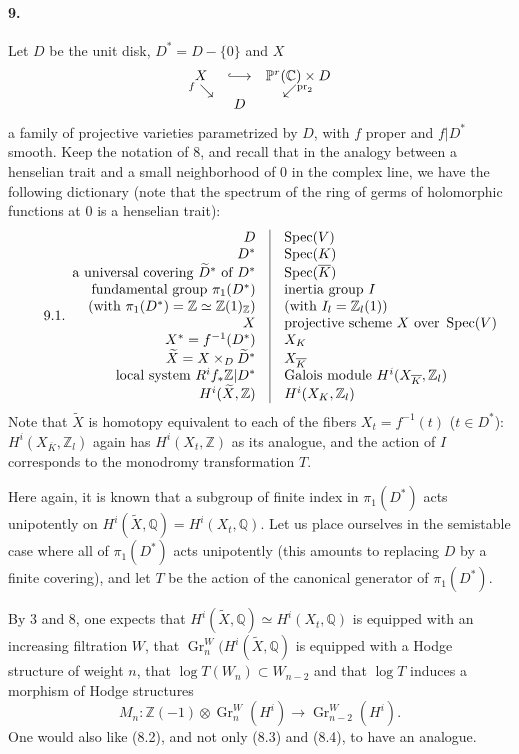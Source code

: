 \documentclass[10pt]{article}
\newcommand{\C}{\mathbb C}
\newcommand{\Q}{\mathbb Q}
\newcommand{\Z}{\mathbb Z}
\newcommand{\Gr}{\operatorname{Gr}}
\newcommand{\Spec}{\operatorname{Spec}}
\newcommand{\pr}{\operatorname{pr}}
\newcommand{\barK}{\overline{K}}
\newcommand{\wt}{\widetilde}
\begin{document}
\paragraph{9.} Let $D$ be the unit disk, $D^*=D-\{0\}$ and $X$
\[
\begin{array}{ccc}
X&\lhook\joinrel\longrightarrow&\mathbb P^r(\C)\times D\\[-0.2em]
{}^{f}\searrow&&\swarrow^{\pr_2}\\[-0.2em]
& D&
\end{array}
\]
a family of projective varieties parametrized by $D$, with $f$ proper and $f|D^*$ smooth. Keep the notation of 8, and recall that in the analogy between a henselian trait and a small neighborhood of $0$ in the complex line, we have the following dictionary (note that the spectrum of the ring of germs of holomorphic functions at $0$ is a henselian trait):
\[
\tag*{9.1.}
\begin{array}{r@{\quad\vrule\quad}l}
D & \Spec(V)\\
D^* & \Spec(K)\\
\text{a universal covering }\wt D^*\text{ of }D^* & \Spec(\barK)\\
\text{fundamental group }\pi_1(D^*) & \text{inertia group }I\\
\text{(with }\pi_1(D^*)=\Z\simeq\Z(1)_\Z\text{)} & \text{(with }I_l=\Z_l(1)\text{)}\\
X & \text{projective scheme }X\text{ over }\Spec(V)\\
X^*=f^{-1}(D^*) & X_K\\
\wt X=X\times_D\wt D^* & X_{\barK}\\
\text{local system }R^if_*\Z|D^* & \text{Galois module }H^i(X_{\barK},\Z_l)\\
H^i(\wt X,\Z) & H^i(X_K,\Z_l) %
\end{array}
\]
Note that $\wt X$ is homotopy equivalent to each of the fibers $X_t=f^{-1}(t)$ ($t\in D^*$): $H^i(X_{\barK},\Z_l)$ again has $H^i(X_t,\Z)$ as its analogue, and the action of $I$ corresponds to the monodromy transformation $T$.

Here again, it is known that a subgroup of finite index in $\pi_1(D^*)$ acts unipotently on $H^i(\wt X,\Q)=H^i(X_t,\Q)$. Let us place ourselves in the semistable case where all of $\pi_1(D^*)$ acts unipotently (this amounts to replacing $D$ by a finite covering), and let $T$ be the action of the canonical generator of $\pi_1(D^*)$.

By 3 and 8, one expects that $H^i(\wt X,\Q)\simeq H^i(X_t,\Q)$ is equipped with an increasing filtration $W$, that $\Gr_n^W(H^i(\wt X,\Q)$ is equipped with a Hodge structure of weight $n$, that $\log T(W_n)\subset W_{n-2}$ and that $\log T$ induces a morphism of Hodge structures %
\[
M_n:\Z(-1)\otimes\Gr_n^W(H^i)\longrightarrow\Gr_{n-2}^W(H^i). %
\]
One would also like (8.2), and not only (8.3) and (8.4), to have an analogue.
\end{document}
